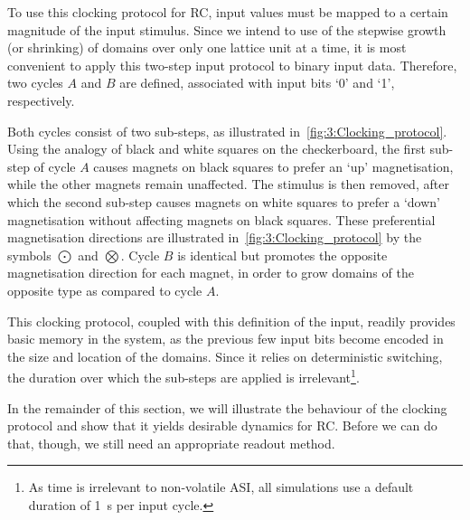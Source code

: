 To use this clocking protocol for RC, input values must be mapped to a certain magnitude of the input stimulus.
Since we intend to use of the stepwise growth (or shrinking) of domains over only one lattice unit at a time, it is most convenient to apply this two-step input protocol to binary input data.
Therefore, two cycles $A$ and $B$ are defined, associated with input bits `0' and `1', respectively. \par
Both cycles consist of two sub-steps, as illustrated in~\cref{fig:3:Clocking_protocol}.
Using the analogy of black and white squares on the checkerboard, the first sub-step of cycle $A$ causes magnets on black squares to prefer an `up' magnetisation, while the other magnets remain unaffected.
The stimulus is then removed, after which the second sub-step causes magnets on white squares to prefer a `down' magnetisation without affecting magnets on black squares.
These preferential magnetisation directions are illustrated in~\cref{fig:3:Clocking_protocol} by the symbols $\bigodot$ and $\bigotimes$.
Cycle $B$ is identical but promotes the opposite magnetisation direction for each magnet, in order to grow domains of the opposite type as compared to cycle $A$. \\\par
This clocking protocol, coupled with this definition of the input, readily provides basic memory in the system, as the previous few input bits become encoded in the size and location of the domains.
Since it relies on deterministic switching, the duration over which the sub-steps are applied is irrelevant\footnote{
	As time is irrelevant to non-volatile ASI, all simulations use a default duration of \qty{1}{\second} per input cycle.
}. \par
In the remainder of this section, we will illustrate the behaviour of the clocking protocol and show that it yields desirable dynamics for RC.
Before we can do that, though, we still need an appropriate readout method.

